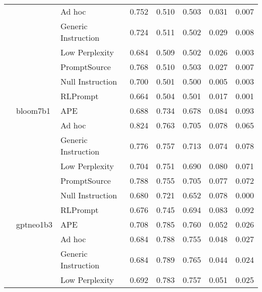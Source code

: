 \begin{supertabular}{lllrrrrr}
              &        & Ad hoc &            0.752 &           0.510 &          0.503 &        0.031 &    0.007 \\
              &        & Generic Instruction &            0.724 &           0.511 &          0.502 &        0.029 &    0.008 \\
              &        & Low Perplexity &            0.684 &           0.509 &          0.502 &        0.026 &    0.003 \\
              &        & PromptSource &            0.768 &           0.510 &          0.503 &        0.027 &    0.007 \\
              &        & Null Instruction &            0.700 &           0.501 &          0.500 &        0.005 &    0.003 \\
              &        & RLPrompt &            0.664 &           0.504 &          0.501 &        0.017 &    0.001 \\
              & bloom7b1 & APE &            0.688 &           0.734 &          0.678 &        0.084 &    0.093 \\
              &        & Ad hoc &            0.824 &           0.763 &          0.705 &        0.078 &    0.065 \\
              &        & Generic Instruction &            0.776 &           0.757 &          0.713 &        0.074 &    0.078 \\
              &        & Low Perplexity &            0.704 &           0.751 &          0.690 &        0.080 &    0.071 \\
              &        & PromptSource &            0.788 &           0.755 &          0.705 &        0.077 &    0.072 \\
              &        & Null Instruction &            0.680 &           0.721 &          0.652 &        0.078 &      0.000 \\
              &        & RLPrompt &            0.676 &           0.745 &          0.694 &        0.083 &    0.092 \\
              & gptneo1b3 & APE &            0.708 &           0.785 &          0.760 &        0.052 &    0.026 \\
              &        & Ad hoc &            0.684 &           0.788 &          0.755 &        0.048 &    0.027 \\
              &        & Generic Instruction &            0.684 &           0.789 &          0.765 &        0.044 &    0.024 \\
              &        & Low Perplexity &            0.692 &           0.783 &          0.757 &        0.051 &    0.025 \\

\end{supertabular}
